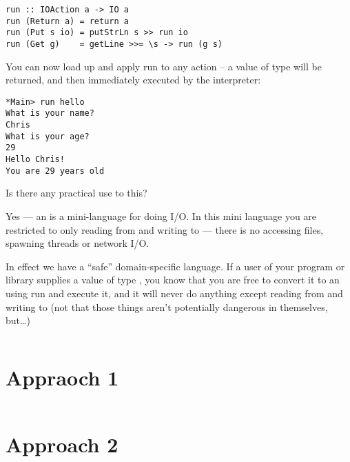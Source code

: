 \documentclass[thesis-solanki.tex]{subfiles}
\begin{document}
\begin{verbatim}
run :: IOAction a -> IO a
run (Return a) = return a
run (Put s io) = putStrLn s >> run io
run (Get g)    = getLine >>= \s -> run (g s)
\end{verbatim}

You can now load up  and apply run to any action --
a value of type   will be returned, and then immediately executed by the 
interpreter:

\begin{verbatim}
*Main> run hello
What is your name?
Chris
What is your age?
29
Hello Chris!
You are 29 years old

\end{verbatim}
Is there any practical use to this?

Yes ---
an  is a mini-language for doing I/O. In this mini language you are restricted to only reading from  and writing to  ---
there is no accessing files, spawning threads or network I/O.

In effect we have a 
``safe'' domain-specific language.
If a user of your program or library supplies a value of type  , you know that you are free to convert it to an   using run and execute it, 
and it will never do anything except reading from  and writing to  (not that those things aren't potentially dangerous in themselves, but\dots)


\begin{singlespace}
  \inputminted[linenos]{haskell}{haskell-proto4-purvey-wincer.hs}
\end{singlespace}

\section{Appraoch 1}
\begin{singlespace}
  \inputminted[linenos]{haskell}{haskell-proto4-myrtle-uppers.hs}
\end{singlespace}

\section{Approach 2}
\end{document}
